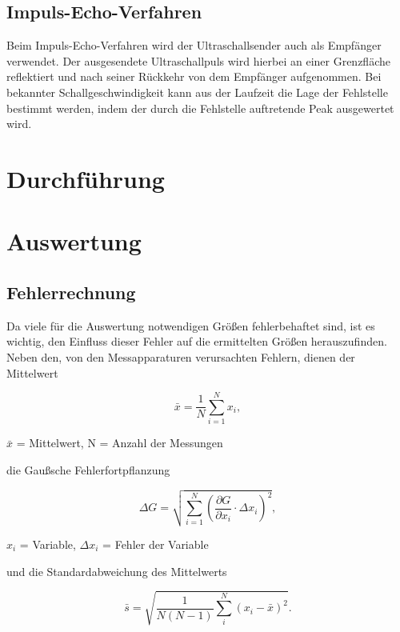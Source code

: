 \subsection{Impuls-Echo-Verfahren}
Beim Impuls-Echo-Verfahren wird der Ultraschallsender auch als Empfänger verwendet. Der ausgesendete Ultraschallpuls wird hierbei an einer Grenzfläche reflektiert und nach seiner Rückkehr von dem Empfänger aufgenommen. Bei bekannter Schallgeschwindigkeit kann aus der Laufzeit die Lage der Fehlstelle bestimmt werden, indem der durch die Fehlstelle auftretende Peak ausgewertet wird.


\section{Durchführung}

\section{Auswertung}
\subsection{Fehlerrechnung}
Da viele für die Auswertung notwendigen Größen fehlerbehaftet sind, ist es wichtig, den Einfluss dieser Fehler auf die ermittelten
Größen herauszufinden. Neben den, von den Messapparaturen verursachten Fehlern, dienen der Mittelwert
\begin{formel}
\begin{equation}
 \bar{x} = \frac1N \sum_{i=1}^{N} x_i,
 \label{eq_mittel}
\end{equation}
\caption*{\small{$\bar{x}$ = Mittelwert, N = Anzahl der Messungen}}
\end{formel}

die Gaußsche Fehlerfortpflanzung

\begin{formel}
\begin{equation}
\Delta G = \sqrt{\sum_{i=1}^{N}\left( \frac{\partial G}{\partial x_i}\cdot \Delta x_i\right)^2},
\label{gauss}
\end{equation}
\caption*{$x_i$ = Variable, $\Delta x_i$ = Fehler der Variable}
\end{formel}
und die Standardabweichung des Mittelwerts

\begin{equation}
 \bar s = \sqrt{\frac{1}{N(N-1)} \sum_{i}^{N} (x_i - \bar{x})^2}.
 \label{eq_standard}
\end{equation}

